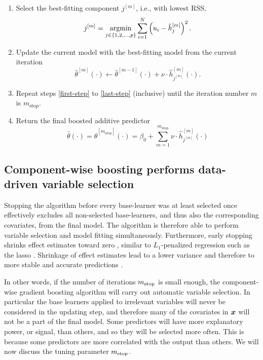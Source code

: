 \begin{algorithm}
\begin{enumerate}
    \item
        Select the best-fitting component $j^{[m]}$, i.e., with lowest RSS,
        \begin{equation*}
            j^{[m]}=\operatorname*{argmin}_{j\in\{1,2,\ldots,p\}}\sum_{i=1}^N \left(u_i-\hat{h}_j^{[m]}\right)^2.
        \end{equation*}
    \item
        \label{last-step}
        Update the current model with the best-fitting model from the current iteration
        \begin{equation*}
            \hat{\theta}^{[m]}(\cdot)\gets \hat{\theta}^{[m-1]}(\cdot)+\nu\cdot \hat{h}_{j^{[m]}}^{[m]}(\cdot).
        \end{equation*}
    \item
        Repeat steps \ref{first-step} to \ref{last-step} (inclusive) until the iteration number $m$ is $m_{\text{stop}}$.
    \item
        Return the final boosted additive predictor
        \begin{equation*}
            \hat{\theta}(\cdot)=\hat{\theta}^{[m_{\text{stop}}]}(\cdot)=\beta_0+\sum_{m=1}^{m_{\text{stop}}}\nu\cdot\hat{h}_{j^{[m]}}^{[m]}(\cdot)
        \end{equation*}
\end{enumerate}
\end{algorithm}

\subsection{Component-wise boosting performs data-driven variable selection}
\label{sec:variable-selection}
Stopping the algorithm before every base-learner was at least selected once effectively excludes all non-selected base-learners, and thus also the corresponding covariates, from the final model.
The algorithm is therefore able to perform variable selection and model fitting simultaneously.
Furthermore, early stopping shrinks effect estimates toward zero \citep{buhlmann2007, DeBin2016}, similar to $L_1$-penalized regression
such as the lasso \citep{lasso, efron2004}.
Shrinkage of effect estimates lead to a lower variance and therefore to more stable and accurate predictions \citep{efron1975, copas1983, ESL}.


In other words, if the number of iterations $m_{\text{stop}}$ is small enough, the component-wise gradient boosting algorithm will carry out automatic variable selection.
In particular the base learners applied to irrelevant variables will never be considered in the updating step, and therefore many of the covariates in $\bm{x}$ will not be a part of the final model.
Some predictors will have more explanatory power, or signal, than others, and so they will be selected more often.
This is because some predictors are more correlated with the output than others.
We will now discuss the tuning parameter $m_{\text{stop}}$.

